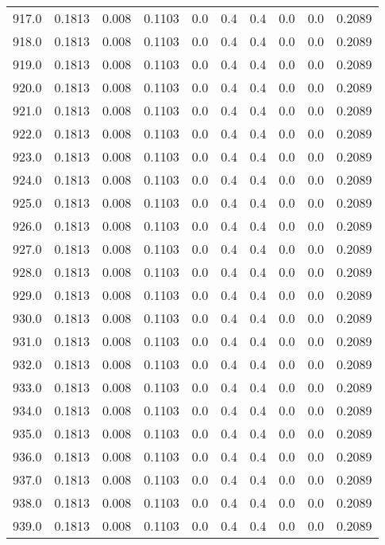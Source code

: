 \begin{longtable}{lrrrrrrrrr}
917.0 & 0.1813 & 0.008 & 0.1103 & 0.0 & 0.4 & 0.4 & 0.0 & 0.0 & 0.2089 \\
918.0 & 0.1813 & 0.008 & 0.1103 & 0.0 & 0.4 & 0.4 & 0.0 & 0.0 & 0.2089 \\
919.0 & 0.1813 & 0.008 & 0.1103 & 0.0 & 0.4 & 0.4 & 0.0 & 0.0 & 0.2089 \\
920.0 & 0.1813 & 0.008 & 0.1103 & 0.0 & 0.4 & 0.4 & 0.0 & 0.0 & 0.2089 \\
921.0 & 0.1813 & 0.008 & 0.1103 & 0.0 & 0.4 & 0.4 & 0.0 & 0.0 & 0.2089 \\
922.0 & 0.1813 & 0.008 & 0.1103 & 0.0 & 0.4 & 0.4 & 0.0 & 0.0 & 0.2089 \\
923.0 & 0.1813 & 0.008 & 0.1103 & 0.0 & 0.4 & 0.4 & 0.0 & 0.0 & 0.2089 \\
924.0 & 0.1813 & 0.008 & 0.1103 & 0.0 & 0.4 & 0.4 & 0.0 & 0.0 & 0.2089 \\
925.0 & 0.1813 & 0.008 & 0.1103 & 0.0 & 0.4 & 0.4 & 0.0 & 0.0 & 0.2089 \\
926.0 & 0.1813 & 0.008 & 0.1103 & 0.0 & 0.4 & 0.4 & 0.0 & 0.0 & 0.2089 \\
927.0 & 0.1813 & 0.008 & 0.1103 & 0.0 & 0.4 & 0.4 & 0.0 & 0.0 & 0.2089 \\
928.0 & 0.1813 & 0.008 & 0.1103 & 0.0 & 0.4 & 0.4 & 0.0 & 0.0 & 0.2089 \\
929.0 & 0.1813 & 0.008 & 0.1103 & 0.0 & 0.4 & 0.4 & 0.0 & 0.0 & 0.2089 \\
930.0 & 0.1813 & 0.008 & 0.1103 & 0.0 & 0.4 & 0.4 & 0.0 & 0.0 & 0.2089 \\
931.0 & 0.1813 & 0.008 & 0.1103 & 0.0 & 0.4 & 0.4 & 0.0 & 0.0 & 0.2089 \\
932.0 & 0.1813 & 0.008 & 0.1103 & 0.0 & 0.4 & 0.4 & 0.0 & 0.0 & 0.2089 \\
933.0 & 0.1813 & 0.008 & 0.1103 & 0.0 & 0.4 & 0.4 & 0.0 & 0.0 & 0.2089 \\
934.0 & 0.1813 & 0.008 & 0.1103 & 0.0 & 0.4 & 0.4 & 0.0 & 0.0 & 0.2089 \\
935.0 & 0.1813 & 0.008 & 0.1103 & 0.0 & 0.4 & 0.4 & 0.0 & 0.0 & 0.2089 \\
936.0 & 0.1813 & 0.008 & 0.1103 & 0.0 & 0.4 & 0.4 & 0.0 & 0.0 & 0.2089 \\
937.0 & 0.1813 & 0.008 & 0.1103 & 0.0 & 0.4 & 0.4 & 0.0 & 0.0 & 0.2089 \\
938.0 & 0.1813 & 0.008 & 0.1103 & 0.0 & 0.4 & 0.4 & 0.0 & 0.0 & 0.2089 \\
939.0 & 0.1813 & 0.008 & 0.1103 & 0.0 & 0.4 & 0.4 & 0.0 & 0.0 & 0.2089 \\

\end{longtable}
